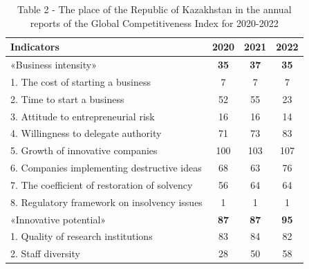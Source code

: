 \begin{table}[H]
\caption*{Table 2 - The place of the Republic of Kazakhstan in the annual reports of the Global Competitiveness Index for 2020-2022}
\centering
\begin{tabular}{|lccc|}
\hline
\multicolumn{1}{|l|}{\textbf{Indicators}}                           & \multicolumn{1}{c|}{\textbf{2020}} & \multicolumn{1}{c|}{\textbf{2021}} & \textbf{2022} \\ \hline
\multicolumn{1}{|l|}{«Business intensity»}                          & \multicolumn{1}{c|}{\textbf{35}}   & \multicolumn{1}{c|}{\textbf{37}}   & \textbf{35}   \\ \hline
\multicolumn{1}{|l|}{1. The cost of starting a business}   & \multicolumn{1}{c|}{7}   & \multicolumn{1}{c|}{7}   & 7   \\ \hline
\multicolumn{1}{|l|}{2. Time to start a business}          & \multicolumn{1}{c|}{52}  & \multicolumn{1}{c|}{55}  & 23  \\ \hline
\multicolumn{1}{|l|}{3. Attitude to entrepreneurial risk}  & \multicolumn{1}{c|}{16}  & \multicolumn{1}{c|}{16}  & 14  \\ \hline
\multicolumn{1}{|l|}{4. Willingness to delegate authority} & \multicolumn{1}{c|}{71}  & \multicolumn{1}{c|}{73}  & 83  \\ \hline
\multicolumn{1}{|l|}{5. Growth of innovative companies}    & \multicolumn{1}{c|}{100} & \multicolumn{1}{c|}{103} & 107 \\ \hline
\multicolumn{1}{|l|}{6. Companies implementing destructive ideas}   & \multicolumn{1}{c|}{68}            & \multicolumn{1}{c|}{63}            & 76            \\ \hline
\multicolumn{1}{|l|}{7. The coefficient of restoration of solvency} & \multicolumn{1}{c|}{56}            & \multicolumn{1}{c|}{64}            & 64            \\ \hline
\multicolumn{1}{|l|}{8. Regulatory framework on insolvency issues}  & \multicolumn{1}{c|}{1}             & \multicolumn{1}{c|}{1}             & 1             \\ \hline
\multicolumn{1}{|l|}{«Innovative potential»}                        & \multicolumn{1}{c|}{\textbf{87}}   & \multicolumn{1}{c|}{\textbf{87}}   & \textbf{95}   \\ \hline
\multicolumn{1}{|l|}{1. Quality of research institutions}  & \multicolumn{1}{c|}{83}  & \multicolumn{1}{c|}{84}  & 82  \\ \hline
\multicolumn{1}{|l|}{2. Staff diversity}                   & \multicolumn{1}{c|}{28}  & \multicolumn{1}{c|}{50}  & 58  \\ \hline

\end{tabular}
\end{table}
